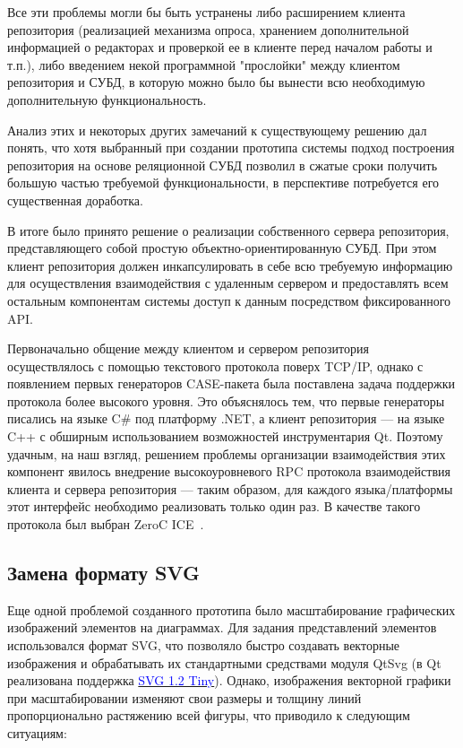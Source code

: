 \documentclass[a5paper]{article}
\newcommand\textstyleInternetlink[1]{\textcolor{blue}{#1}}
\begin{document}
Все эти проблемы могли бы быть устранены либо расширением клиента
репозитория (реализацией механизма опроса, хранением дополнительной
информацией о редакторах и проверкой ее в клиенте перед началом работы
и т.п.), либо введением некой программной "прослойки" между клиентом
репозитория и СУБД, в которую можно было бы вынести всю необходимую
дополнительную функциональность.

Анализ этих и некоторых других замечаний к существующему решению дал
понять, что хотя выбранный при создании прототипа системы подход
построения репозитория на основе реляционной СУБД позволил в сжатые
сроки получить большую частью требуемой функциональности, в перспективе
потребуется его существенная доработка. 

В итоге было принято решение о реализации собственного сервера
репозитория, представляющего собой простую объектно-ориентированную
СУБД. При этом клиент репозитория должен инкапсулировать в себе всю
требуемую информацию для осуществления взаимодействия с удаленным
сервером и предоставлять всем остальным компонентам системы доступ к
данным посредством фиксированного API. 

Первоначально общение между клиентом и сервером репозитория
осуществлялось с помощью текстового протокола поверх
TCP/IP, однако с появлением первых генераторов CASE-пакета
была поставлена задача поддержки протокола более высокого уровня. Это
объяснялось тем, что первые генераторы писались на языке
C\# под платформу .NET, а клиент репозитория --- на языке
C++ с обширным использованием возможностей
инструментария Qt. Поэтому удачным, на наш
взгляд, решением проблемы организации взаимодействия этих компонент
явилось внедрение высокоуровневого RPC
протокола взаимодействия клиента и сервера репозитория --- таким образом,
для каждого языка/платформы этот интерфейс необходимо реализовать
только один раз. В качестве такого протокола был выбран
ZeroC ICE~\cite{ice}.

\subsection{Замена формату SVG}

Еще одной проблемой созданного прототипа было масштабирование
графических изображений элементов на диаграммах. Для задания
представлений элементов использовался формат SVG, что позволяло быстро
создавать векторные изображения и обрабатывать их стандартными
средствами модуля QtSvg (в Qt реализована поддержка
\href{http://www.w3.org/TR/SVGMobile12/}{\textstyleInternetlink{SVG 1.2 Tiny}}). 
Однако, изображения векторной графики при масштабировании
изменяют свои размеры и толщину линий пропорционально растяжению всей
фигуры, что приводило к следующим ситуациям:
\end{document}
